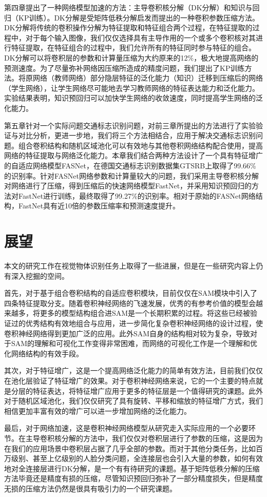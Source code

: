 第四章提出了一种网络模型加速的方法：主导卷积核分解（DK分解）和知识与回归（KP训练）。DK分解是受矩阵低秩分解启发而提出的一种卷积参数压缩方法。DK分解将传统的卷积操作分解为特征提取和特征组合两个过程，在特征提取的过程中，对于每个输入图像，我们仅仅选择具有主导作用的一个或多个卷积核对其进行特征提取，在特征组合的过程中，我们允许所有的特征同时参与特征的组合。DK分解可以将卷积层的参数和计算量压缩为大约原来的12\%，极大地提高网络的预测速度。为了尽量弥补网络因压缩所造成的精度问题，我们提出了KP训练方法。将原网络（教师网络）部分隐层特征的泛化能力（知识）迁移到压缩后的网络（学生网络），让学生网络尽可能地去学习教师网络的特征表达能力和泛化能力。实验结果表明，知识预回归可以加快学生网络的收敛速度，同时提高学生网络的泛化能力。

第五章针对一个实际问题交通标志识别问题，对前三章所提出的方法进行了实验验证与对比分析，更进一步地，我们将三个方法相结合，应用于解决交通标志识别问题。组合卷积结构和随机区域池化可以有效地与其他卷积网络结构配合使用，提高网络的特征提取与网络泛化能力。本章我们结合两种方法设计了一个具有特征增广的自适应网络模型FASNet，在德国交通标志识别数据集GTSRB上取得了99.66\%的识别率。针对FASNet网络参数和计算量较大的问题，我们采用主导卷积核分解对网络进行了压缩，得到压缩后的快速网络模型FastNet，并采用知识预回归的方法对FastNet进行训练，最终取得了99.27\%的识别率。相对于原始的FASNet网络结构，FastNet具有近10倍的参数压缩率和预测速度提升。


\section{展望}

本文的研究工作在视觉物体识别任务上取得了一些进展，但是在一些研究内容上仍有深入挖掘的空间。

首先，对于基于组合卷积结构的自适应卷积模块，目前仅仅在SAM模块中引入了四条特征提取分支。随着卷积神经网络的飞速发展，优秀的有参考价值的模型会越来越多，将更多的模型结构组合进SAM是一个长期积累的过程。将这些已经被验证过的优秀结构有效地组合与应用，进一步简化复杂卷积神经网络的设计过程，使卷积神经网络得到更加广泛的应用。此外SAM自身的结构相对较为复杂，导致对于SAM的理解和可视化工作变得非常困难，而网络的可视化工作是一个理解和优化网络结构的有效手段。

其次，对于特征增广，这是一个提高网络泛化能力的简单有效方法，目前我们仅仅在池化层验证了特征增广的效果。对于卷积神经网络来说，它的一个主要的特点就是分层的特征表达，将特征增广应用于更多的特征层是一个值得研究的课题。此外对于随机区域池化，我们仅仅研究了具有旋转、平移和缩放的特征增广方式，我们相信更加丰富有效的增广可以进一步增加网络的泛化能力。

最后，对于网络加速，这是卷积神经网络模型从研究走入实际应用的一个必要环节。在主导卷积核分解的方法中，我们仅仅对卷积层进行了参数的压缩，这是因为在我们的应用场景中卷积层占据了几乎全部的参数。而对于其他分类任务，比如百万级别、甚至上亿级别的人脸分类问题，全连接层也会引入大量的参数，如何有效地对全连接层进行DK分解，是一个有有待研究的课题。基于矩阵低秩分解的压缩方法毕竟还是精度有损的压缩，尽管知识预回归弥补了一部分精度损失，但是精度无损的压缩方法仍然是很具有吸引力的一个研究课题。


